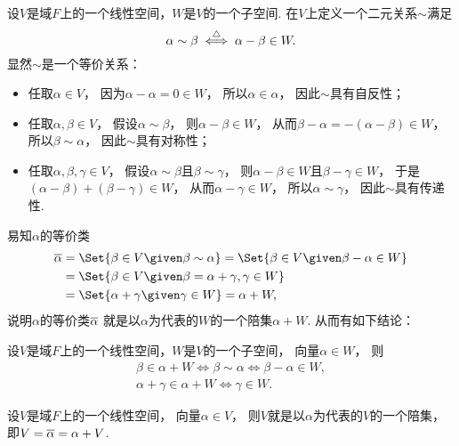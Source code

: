 设\(V\)是域\(F\)上的一个线性空间，\(W\)是\(V\)的一个子空间.
在\(V\)上定义一个二元关系\(\sim\)满足\begin{equation*}
	\alpha\sim\beta
	\overset{\triangle}{\iff}
	\alpha-\beta\in W.
\end{equation*}
显然\(\sim\)是一个等价关系：\begin{itemize}
	\item 任取\(\alpha \in V\)，
	因为\(\alpha - \alpha = 0 \in W\)，
	所以\(\alpha \in \alpha\)，
	因此\(\sim\)具有自反性；
	\item 任取\(\alpha,\beta \in V\)，
	假设\(\alpha \sim \beta\)，
	则\(\alpha - \beta \in W\)，
	从而\(\beta - \alpha = - (\alpha - \beta) \in W\)，
	所以\(\beta \sim \alpha\)，
	因此\(\sim\)具有对称性；
	\item 任取\(\alpha,\beta,\gamma \in V\)，
	假设\(\alpha \sim \beta\)且\(\beta \sim \gamma\)，
	则\(\alpha - \beta \in W\)且\(\beta - \gamma \in W\)，
	于是\(
		(\alpha - \beta)	\allowbreak
		+					\allowbreak
		(\beta - \gamma)	\allowbreak
		\in W
	\)，
	从而\(\alpha - \gamma \in W\)，
	所以\(\alpha \sim \gamma\)，
	因此\(\sim\)具有传递性.
\end{itemize}
易知\(\alpha\)的等价类\begin{align*}
	\EquivalenceClassO{\alpha}
	&= \Set{ \beta \in V \given \beta \sim \alpha }
	= \Set{ \beta \in V \given \beta - \alpha \in W } \\
	&= \Set{ \beta \in V \given \beta = \alpha + \gamma, \gamma \in W } \\
	&= \Set{ \alpha+\gamma \given \gamma \in W }
	= \alpha+W,
\end{align*}
说明\(\alpha\)的等价类\(\EquivalenceClassO{\alpha}\)
就是以\(\alpha\)为代表的\(W\)的一个陪集\(\alpha+W\).
从而有如下结论：
\begin{proposition}\label{theorem:商空间.陪集的元素的性质}
设\(V\)是域\(F\)上的一个线性空间，\(W\)是\(V\)的一个子空间，
向量\(\alpha \in W\)，
则\begin{gather*}
	\beta \in \alpha + W
	\iff
	\beta \sim \alpha
	\iff
	\beta - \alpha \in W, \\
	\alpha + \gamma \in \alpha + W
	\iff
	\gamma \in W.
\end{gather*}
\end{proposition}

\begin{proposition}
设\(V\)是域\(F\)上的一个线性空间，
向量\(\alpha \in V\)，
则\(V\)就是以\(\alpha\)为代表的\(V\)的一个陪集，
即\(
	V
	= \EquivalenceClassO{\alpha}
	= \alpha + V
\).
\end{proposition}

